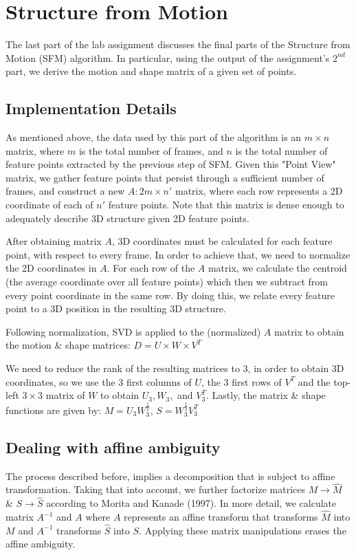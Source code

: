 \section{Structure from Motion}
\label{sfm}

The last part of the lab assignment discusses the final parts of the Structure from Motion (SFM) algorithm. In particular, using the output of the assignment's $2^{nd}$ part, we derive the motion and shape matrix of a given set of points.  

\subsection{Implementation Details}
As mentioned above, the data used by this part of the algorithm is an $m\times n$ matrix, where $m$ is the total number of frames, and $n$ is the total number of feature points extracted by the previous step of SFM. 
Given this "Point View" matrix, we gather feature points that persist through a sufficient number of frames, and construct a new $A: 2m\times n'$ matrix, where each row represents a 2D coordinate of each of $n'$ feature points. Note that this matrix is dense enough to adequately describe 3D structure given 2D feature points.

After obtaining matrix $A$, 3D coordinates must be calculated for each feature point, with respect to every frame. In order to achieve that, we need to normalize the 2D coordinates in $A$. For each row of the $A$ matrix, we calculate the centroid (the average coordinate over all feature points) which then we subtract from every point coordinate in the same row. By doing this, we relate every feature point to a 3D position in the resulting 3D structure.

Following normalization, SVD is applied to the (normalized) $A$ matrix to obtain the motion \& shape matrices:  
$D = U\times W\times V^T$

We need to reduce the rank of the resulting matrices to 3, in order to obtain 3D coordinates, so we use the 3 first columns of $U$, the 3 first rows of $V^T$ and the top-left $3\times 3$ matrix of $W$ to obtain $U_3, W_3,$ and $V^T_3$. Lastly, the matrix \& shape functions are given by: $M = U_3W^{\frac{1}{2}}_3$, $S = W_3^{\frac{1}{2}}V^T_3$

\subsection{Dealing with affine ambiguity}
The process described before, implies a decomposition that is subject to affine transformation\citep{amb}. Taking that into account, we further factorize matrices $M\rightarrow \hat{M}$ \& $S\rightarrow \hat{S}$ according to Morita and Kanade (1997)\cite{amb}. In more detail, we calculate matrix $A^{-1}$ and $A$ where $A$ represents an affine transform that transforms $\hat{M}$ into $M$ and $A^{-1}$ transforms $\hat{S}$ into $S$. Applying these matrix manipulations erases the affine ambiguity.

